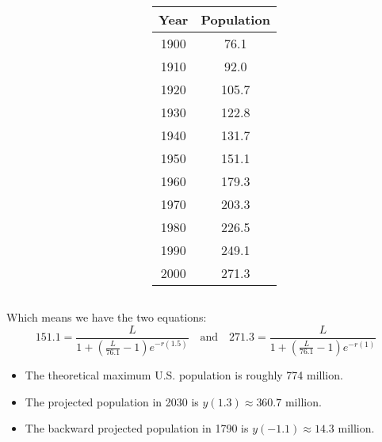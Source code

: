 \documentclass{beamer}
\begin{document}
\begin{frame}
\begin{example}
\begin{overprint}
\begin{columns}
\begin{column}{0.7\linewidth}
\vspace{2mm}
\end{column}
\begin{column}{0.28\linewidth}
\begin{tabular}{|cc|}
\hline
Year & Population \\
\hline
1900 & \phantom{1}76.1 \\
1910 & \phantom{1}92.0 \\
1920 & 105.7 \\
1930 & 122.8 \\
1940 & 131.7 \\
1950 & 151.1 \\
1960 & 179.3 \\
1970 & 203.3 \\
1980 & 226.5 \\
1990 & 249.1 \\
2000 & 271.3 \\
\hline
\end{tabular}
\end{column}
\end{columns}
Which means we have the two equations:
\begin{equation*}
151.1=\dfrac{L}{1+\left(\tfrac{L}{76.1}-1\right)e^{-r(1.5)}}
\quad\text{and}\quad
271.3=\dfrac{L}{1+\left(\tfrac{L}{76.1}-1\right)e^{-r(1)}}
\end{equation*}

\vspace{2mm}

\vspace{-2mm}
\begin{itemize}
\item<8-> The theoretical maximum U.S. population is roughly 774 million.
\item<9-> The projected population in 2030 is $y(1.3)\approx 360.7$ million.
\item<10-> The backward projected population in 1790 is $y(-1.1)\approx 14.3$ million. 
\end{itemize}
\end{overprint}
\end{example}
\end{frame}
\end{document}
